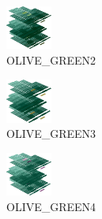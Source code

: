 \hspace{0.1cm}
\begin{minipage}[b]{0.15\linewidth}
\begin{figure}[H]                                                          
  \centering                                                             
  \begin{adjustbox}{width=1.5cm,center}                                   
  \includegraphics[width=1.5cm]{src/colorspace_colourflow/flows/colourflow_178-45.png}%
  \end{adjustbox}                                                        
\caption*{OLIVE\_GREEN2}                                           
\end{figure}                                                               
\end{minipage}
\hspace{0.1cm}
\begin{minipage}[b]{0.15\linewidth}
\begin{figure}[H]                                                          
  \centering                                                             
  \begin{adjustbox}{width=1.5cm,center}                                   
  \includegraphics[width=1.5cm]{src/colorspace_colourflow/flows/colourflow_179-45.png}%
  \end{adjustbox}                                                        
\caption*{OLIVE\_GREEN3}                                           
\end{figure}                                                               
\end{minipage}
\hspace{0.1cm}
\begin{minipage}[b]{0.15\linewidth}
\begin{figure}[H]                                                          
  \centering                                                             
  \begin{adjustbox}{width=1.5cm,center}                                   
  \includegraphics[width=1.5cm]{src/colorspace_colourflow/flows/colourflow_180-45.png}%
  \end{adjustbox}                                                        
\caption*{OLIVE\_GREEN4}                                           
\end{figure}                                                               
\end{minipage}
